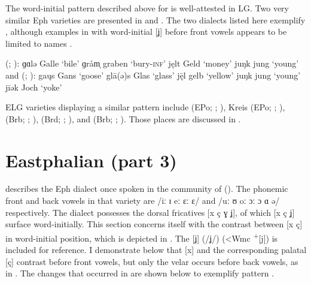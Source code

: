 The word-initial pattern described above for  is well-at\-test\-ed in LG. Two very similar Eph varieties are presented in  and . The two dialects listed here exemplify , although examples in  with word-initial [ʝ] before front vowels appears to be limited to names \citep[17]{Roloff1902}.

\ea%
\label{ex:8:28} (\citealt{Roloff1902}; ):
\ea\label{ex:8:28a} ɡɑlə  \tab  [gɑlə]   \tab Galle    \tab  ‘bile’ 
\ex\label{ex:8:28b} ɡråm̩ \tab   [grɑm̩] \tab   graben \tab    ‘bury\textsc{{}-inf}’ 
\ex\label{ex:8:28c} jęlt  \tab  [ʝɛlt]   \tab Geld     \tab  ‘money’ 
\ex\label{ex:8:28d} juŋk  \tab  [ʝuŋk]   \tab jung     \tab  ‘young’ 
\z 
\ex%
\label{ex:8:29} and  (\citealt{Lange1963}; ):
\ea\label{ex:8:29a} ga\k{u}s \tab [gɑʊs] \tab Gans \tab ‘goose’ 
\ex\label{ex:8:29b} glā(ə)s \tab [glɑː(ə)s] \tab Glas \tab ‘glass’ 
\ex\label{ex:8:29c} j\={ę}l \tab [ʝɛːl] \tab  gelb \tab ‘yellow’ 
\ex\label{ex:8:29d} juŋk \tab [ʝuŋk] \tab jung \tab ‘young’ \\
    jīək \tab [ʝiːək] \tab Joch \tab ‘yoke’ 
\z 
\z

ELG varieties displaying a similar pattern include  (EPo; \citealt{Pirk1928}; ), Kreis  (EPo; \citealt{Kühl1932}; ),  (Brb; \citealt{Teuchert1907a,Teuchert1907b}; ),  (Brd; \citealt{Teuchert1930}; ), and  (Brb; \citealt{Siewert1912}; ). Those places are discussed in .

\section{{Eastphalian} {(part} {3)}}\label{sec:8.5}

\citet{Schütze1953} describes the Eph dialect once spoken in the community of  (). The phonemic front and back vowels in that variety are /iː ɪ eː ɛː ɛ/ and /uː ʊ oː ɔː ɔ ɑ ə/ respectively. The dialect possesses the dorsal fricatives [x ç ɣ ʝ], of which [x ç ʝ] surface word-initially. This section concerns itself with the contrast between [x ç] in word-initial position, which is depicted in . The  [ʝ] (/ʝ/) (<Wmc \textsuperscript{+}[j]) is included for reference. I demonstrate below that [x] and the corresponding palatal [ç] contrast before front vowels, but only the velar occurs before back vowels, as in . The changes that occurred in  are shown below to exemplify pattern .

